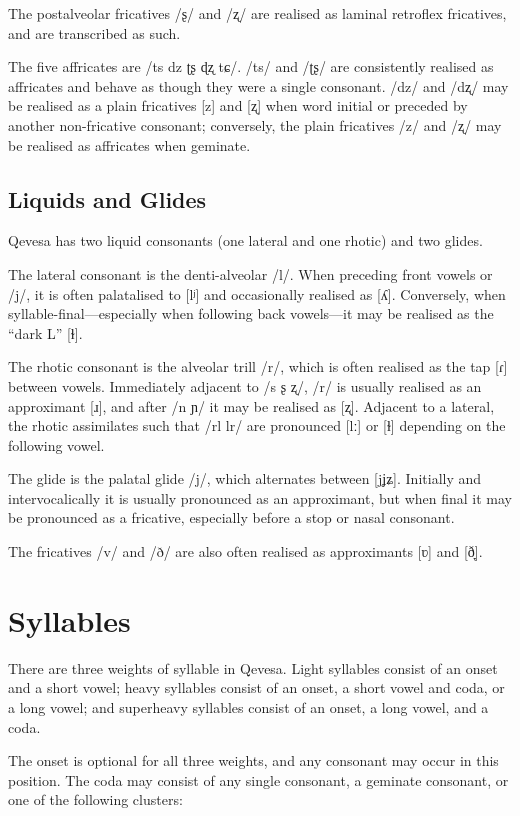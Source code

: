 \documentclass[grammar]{subfiles}
\begin{document}
The postalveolar fricatives /ʂ/ and /ʐ/ are realised as laminal retroflex
fricatives, and are transcribed as such.

The five affricates are /ts dz ʈʂ ɖʐ tɕ/.  /ts/ and /ʈʂ/ are consistently
realised as affricates and behave as though they were a single consonant.  /dz/
and /dʐ/ may be realised as a plain fricatives [z] and [ʐ] when word initial or
preceded by another non-fricative consonant; conversely, the plain fricatives /z/
and /ʐ/ may be realised as affricates when geminate.


\subsection{Liquids and Glides}
\label{ssec:liquids}

Qevesa has two liquid consonants (one lateral and one rhotic) and two glides.

The lateral consonant is the denti-alveolar /l/.  When preceding front vowels
or /j/, it is often palatalised to [lʲ] and occasionally realised as [ʎ].
Conversely, when syllable-final—especially when following back vowels—it may be
realised as the “dark L” [ɫ].

The rhotic consonant is the alveolar trill /r/, which is often realised as the
tap [ɾ] between vowels.  Immediately adjacent to /s ʂ ʐ/, /r/ is usually
realised as an approximant [ɹ], and after /n ɲ/ it may be realised as [ʐ].
Adjacent to a lateral, the rhotic assimilates such that /rl lr/ are pronounced
[lː] or [ɫ] depending on the following vowel.

The glide is the palatal glide /j/, which alternates between [j\tlde ʝ\tlde ʑ].
Initially and intervocalically it is usually pronounced as an approximant, but
when final it may be pronounced as a fricative, especially before a stop or
nasal consonant.  

The fricatives /v/ and /ð/ are also often realised as approximants [ʋ] and [ð̞].  


\section{Syllables}
\label{sec:syllables}

There are three weights of syllable in Qevesa. Light syllables consist of an
onset and a short vowel; heavy syllables consist of an onset, a short vowel and
coda, or a long vowel; and superheavy syllables consist of an onset, a long
vowel, and a coda. 

The onset is optional for all three weights, and any consonant may occur in
this position. The coda may consist of any single consonant, a geminate
consonant, or one of the following clusters:
\end{document}
